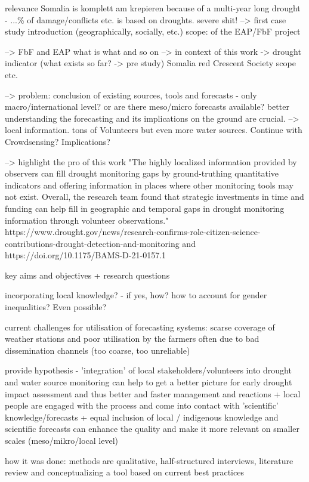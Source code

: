 relevance
Somalia is komplett am krepieren because of a multi-year long drought - ...\% of damage/conflicts etc. is based on droughts. severe shit! --> first case study introduction (geographically, socially, etc.) 
scope: of the EAP/FbF project

--> FbF and EAP what is what and so on --> in context of this work -> drought indicator (what exists so far? -> pre study)
Somalia red Crescent Society scope etc. 

--> problem: conclusion of existing sources, tools and forecasts - only macro/international level? or are there meso/micro forecasts available?
better understanding the forecasting and its implications on the ground are crucial. --> local information. tons of Volunteers but even more water sources. Continue with Crowdsensing? Implications?

--> highlight the pro of this work
"The highly localized information provided by observers can fill drought monitoring gaps by ground-truthing quantitative indicators and offering information in places where other monitoring tools may not exist. Overall, the research team found that strategic investments in time and funding can help fill in geographic and temporal gaps in drought monitoring information through volunteer observations."
https://www.drought.gov/news/research-confirms-role-citizen-science-contributions-drought-detection-and-monitoring and https://doi.org/10.1175/BAMS-D-21-0157.1

key aims and objectives + research questions

incorporating local knowledge? - if yes, how?
how to account for gender inequalities? Even possible?

current challenges for utilisation of forecasting systems: scarse coverage of weather stations and poor utilisation by the farmers often due to bad dissemination channels  (too coarse, too unreliable)

provide hypothesis - 'integration' of local stakeholders/volunteers into drought and water source monitoring can help to get a better picture for early drought impact assessment and thus better and faster management and reactions
+ local people are engaged with the process and come into contact with 'scientific' knowledge/forecasts 
+ equal inclusion of local / indigenous knowledge and scientific forecasts can enhance the quality and make it more relevant on smaller scales (meso/mikro/local level)


how it was done: methods are qualitative, half-structured interviews, literature review and conceptualizing a tool based on current best practices

